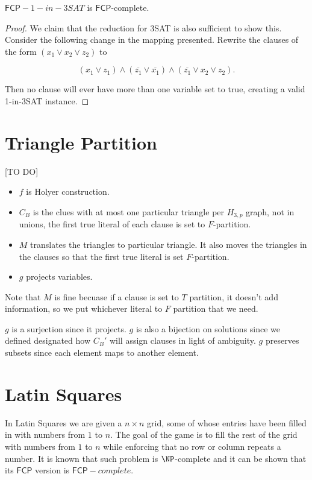 \documentclass[runningheads,a4paper]{llncs}
\begin{document}
\begin{theorem}
$\mathsf{FCP}-1-in-3SAT$ is $\mathsf{FCP}$-complete. 
\end{theorem} 

\begin{proof}
We claim that the reduction for 3SAT is also sufficient to show this. Consider the following change in the mapping presented. Rewrite the clauses of the form  $(x_1 \vee x_2 \vee z_2)$ to 

$$(x_1 \vee z_1) \wedge (\overline{z_1} \vee \overline{x_1}) \wedge (\overline{z_1} \vee x_2 \vee z_2).$$

Then no clause will ever have more than one variable set to true, creating a valid 1-in-3SAT instance.  
\end{proof}

\section{Triangle Partition}
[TO DO]
\begin{itemize}
\item $f$ is Holyer construction.
\item $C_B$ is the clues with at most one particular triangle per $H_{3,p}$ graph, not in unions, the first true literal of each clause is set to $F$-partition. 
\item $M$ translates the triangles to particular triangle. It also moves the triangles in the clauses so that the first true literal is set $F$-partition.
\item $g$ projects variables. 
\end{itemize}

Note that $M$ is fine becuase if a clause is set to $T$ partition, it doesn't add information, so we put whichever literal to $F$ partition that we need. 

$g$ is a surjection since it projects. $g$ is also a bijection on solutions since we defined designated how $C_B'$ will assign clauses in light of ambiguity. $g$ preserves subsets since each element maps to another element. 

\section{Latin Squares}

In Latin Squares we are given a $n \times n$ grid, some of whose entries have been filled in with numbers from $1$ to $n$. The goal of the game is to fill the rest of the grid with numbers from $1$ to $n$ while enforcing that no row or column repeats a number. It is known that such problem is $\NP$-complete and it can be shown that its $\mathsf{FCP}$ version is $\mathsf{FCP}-complete$. 
\end{document}
